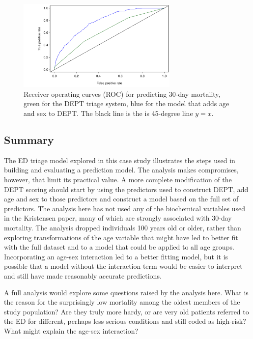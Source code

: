\begin{figure}[!tbh]
  \centering
  \includegraphics[width=0.70\textwidth]
  {ch_logistic_regression_oi_biostat/figures/ROCDanishED/ROCDanishED.pdf}
    \caption{Receiver operating curves (ROC) for predicting 30-day mortality,  green for the DEPT triage system, blue for the model that adds age and sex to DEPT\@.  The black line is the is 45-degree line $y = x$.}
    \label{figure:ROCDanishED}
\end{figure}

\textD{\newpage}

\subsection{Summary}
\label{section:interpretationNewColorScore}

The ED triage model explored in this case study illustrates the steps used in building and evaluating a prediction model.   The analysis makes compromises, however, that limit its practical value.  A more complete modification of the DEPT scoring should start by using the predictors used to construct DEPT, add age and sex to those predictors and construct a model based on the full set of predictors.   The analysis here has not used any of the biochemical variables used in the Kristensen paper, many of which are strongly associated with 30-day mortality. The analysis dropped individuals 100 years old or older, rather than exploring transformations of the age variable that might have led to  better fit with the full dataset and to a model that could be applied to all age groups.  Incorporating an age-sex interaction led to a better fitting model, but it is possible that a model without the interaction term would be easier to interpret and still have made reasonably accurate predictions. 

A full analysis would explore some questions raised by the analysis here.  What is the reason for the surprisingly low mortality among the oldest members of the study population? Are they truly more hardy, or are very old patients referred to the ED for different, perhaps less serious conditions and still coded as high-risk?  What might explain the age-sex interaction? 

